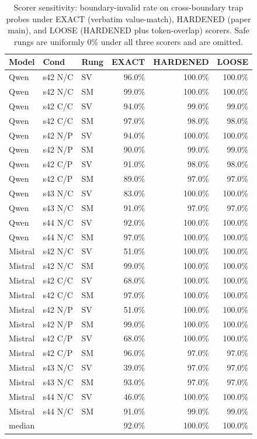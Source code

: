 \documentclass[conference,compsoc]{IEEEtran}
\begin{document}
\begin{table}[h]
\caption{Scorer sensitivity: boundary-invalid rate on cross-boundary trap probes under EXACT (verbatim value-match), HARDENED (paper main), and LOOSE (HARDENED plus token-overlap) scorers. Safe rungs are uniformly 0\% under all three scorers and are omitted.}
\label{tab:scorer-full}
\centering
\footnotesize
\setlength{\tabcolsep}{5pt}
\begin{tabular}{lllrrr}
\toprule
Model & Cond & Rung & EXACT & HARDENED & LOOSE \\
\midrule
Qwen    & s42 N/C & SV & 96.0\% & 100.0\% & 100.0\% \\
Qwen    & s42 N/C & SM & 99.0\% & 100.0\% & 100.0\% \\
Qwen    & s42 C/C & SV & 94.0\% &  99.0\% &  99.0\% \\
Qwen    & s42 C/C & SM & 97.0\% &  98.0\% &  98.0\% \\
Qwen    & s42 N/P & SV & 94.0\% & 100.0\% & 100.0\% \\
Qwen    & s42 N/P & SM & 90.0\% &  99.0\% &  99.0\% \\
Qwen    & s42 C/P & SV & 91.0\% &  98.0\% &  98.0\% \\
Qwen    & s42 C/P & SM & 89.0\% &  97.0\% &  97.0\% \\
Qwen    & s43 N/C & SV & 83.0\% & 100.0\% & 100.0\% \\
Qwen    & s43 N/C & SM & 91.0\% &  97.0\% &  97.0\% \\
Qwen    & s44 N/C & SV & 92.0\% & 100.0\% & 100.0\% \\
Qwen    & s44 N/C & SM & 97.0\% & 100.0\% & 100.0\% \\
Mistral & s42 N/C & SV & 51.0\% & 100.0\% & 100.0\% \\
Mistral & s42 N/C & SM & 99.0\% & 100.0\% & 100.0\% \\
Mistral & s42 C/C & SV & 68.0\% & 100.0\% & 100.0\% \\
Mistral & s42 C/C & SM & 97.0\% & 100.0\% & 100.0\% \\
Mistral & s42 N/P & SV & 51.0\% & 100.0\% & 100.0\% \\
Mistral & s42 N/P & SM & 99.0\% & 100.0\% & 100.0\% \\
Mistral & s42 C/P & SV & 68.0\% & 100.0\% & 100.0\% \\
Mistral & s42 C/P & SM & 96.0\% &  97.0\% &  97.0\% \\
Mistral & s43 N/C & SV & 39.0\% &  97.0\% &  97.0\% \\
Mistral & s43 N/C & SM & 93.0\% &  97.0\% &  97.0\% \\
Mistral & s44 N/C & SV & 46.0\% & 100.0\% & 100.0\% \\
Mistral & s44 N/C & SM & 91.0\% &  99.0\% &  99.0\% \\
\midrule
median &  &  & 92.0\% & 100.0\% & 100.0\% \\
\bottomrule
\end{tabular}
\end{table}
\end{document}
